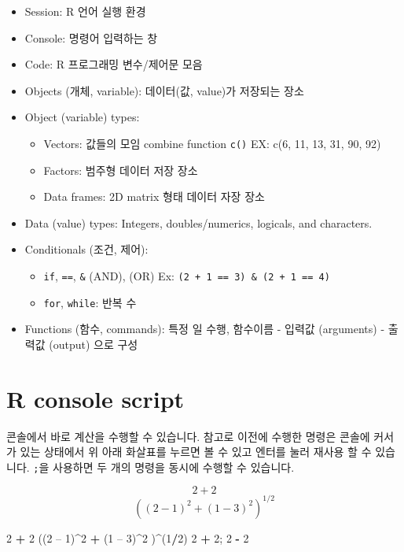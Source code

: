 \documentclass[
]{book}
\newenvironment{Shaded}{\begin{snugshade}}{\end{snugshade}}
\newcommand{\DecValTok}[1]{\textcolor[rgb]{0.00,0.00,0.81}{#1}}
\newcommand{\NormalTok}[1]{#1}
\newcommand{\OperatorTok}[1]{\textcolor[rgb]{0.81,0.36,0.00}{\textbf{#1}}}
\newcommand{\StringTok}[1]{\textcolor[rgb]{0.31,0.60,0.02}{#1}}
\providecommand{\tightlist}{%
  \setlength{\itemsep}{0pt}\setlength{\parskip}{0pt}}
\begin{document}
\begin{itemize}
\tightlist
\item
  Session: R 언어 실행 환경
\item
  Console: 명령어 입력하는 창
\item
  Code: R 프로그래밍 변수/제어문 모음
\item
  Objects (개체, variable): 데이터(값, value)가 저장되는 장소
\item
  Object (variable) types:

  \begin{itemize}
  \tightlist
  \item
    Vectors: 값들의 모임 combine function \texttt{c()} EX: c(6, 11, 13, 31, 90, 92)
  \item
    Factors: 범주형 데이터 저장 장소
  \item
    Data frames: 2D matrix 형태 데이터 자장 장소
  \end{itemize}
\item
  Data (value) types: Integers, doubles/numerics, logicals, and characters.
\item
  Conditionals (조건, 제어):

  \begin{itemize}
  \tightlist
  \item
    \texttt{if}, \texttt{==}, \texttt{\&} (AND), \texttt{\textbar{}} (OR) Ex: \texttt{(2\ +\ 1\ ==\ 3)\ \&\ (2\ +\ 1\ ==\ 4)}
  \item
    \texttt{for}, \texttt{while}: 반복 수
  \end{itemize}
\item
  Functions (함수, commands): 특정 일 수행, 함수이름 - 입력값 (arguments) - 출력값 (output) 으로 구성
\end{itemize}

\hypertarget{r-console-script}{%
\section{R console script}\label{r-console-script}}

콘솔에서 바로 계산을 수행할 수 있습니다. 참고로 이전에 수행한 명령은 콘솔에 커서가 있는 상태에서 위 아래 화살표를 누르면 볼 수 있고 엔터를 눌러 재사용 할 수 있습니다. \texttt{;}을 사용하면 두 개의 명령을 동시에 수행할 수 있습니다.

\[ 2 + 2 \]
\[ ((2 - 1)^2 + (1 - 3)^2)^{1/2} \]

\begin{Shaded}
\begin{Highlighting}[]
\DecValTok{2} \OperatorTok{+}\StringTok{ }\DecValTok{2}
\NormalTok{((}\DecValTok{2}\NormalTok{ – }\DecValTok{1}\NormalTok{)}\OperatorTok{\^{}}\DecValTok{2} \OperatorTok{+}\StringTok{ }\NormalTok{(}\DecValTok{1}\NormalTok{ – }\DecValTok{3}\NormalTok{)}\OperatorTok{\^{}}\DecValTok{2}\NormalTok{ )}\OperatorTok{\^{}}\NormalTok{(}\DecValTok{1}\OperatorTok{/}\DecValTok{2}\NormalTok{)}
\DecValTok{2} \OperatorTok{+}\StringTok{ }\DecValTok{2}\NormalTok{; }\DecValTok{2} \OperatorTok{{-}}\StringTok{ }\DecValTok{2}
\end{Highlighting}
\end{Shaded}
\end{document}
